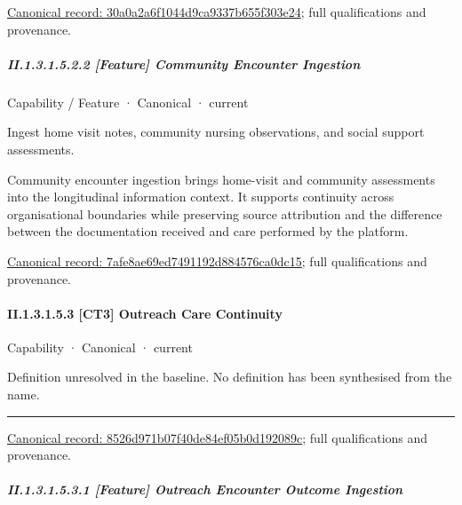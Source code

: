 {\footnotesize \href{../../../../continuum/strategy/capability/feature/30a0a2a6f1044d9ca9337b655f303e24.md}{Canonical record: 30a0a2a6f1044d9ca9337b655f303e24}; full qualifications and provenance.}\par
\subparagraph*{II.1.3.1.5.2.2 [Feature] Community Encounter Ingestion}
\label{navigation:II.1.3.1.5.2.2}

\label{element:7afe8ae69ed7491192d884576ca0dc15}
{\small Capability / Feature · Canonical · current}\par

Ingest home visit notes, community nursing observations, and social support assessments.



Community encounter ingestion brings home-visit and community assessments into the longitudinal information context. It supports continuity across organisational boundaries while preserving source attribution and the difference between the documentation received and care performed by the platform.


{\footnotesize \href{../../../../continuum/strategy/capability/feature/7afe8ae69ed7491192d884576ca0dc15.md}{Canonical record: 7afe8ae69ed7491192d884576ca0dc15}; full qualifications and provenance.}\par
\paragraph*{II.1.3.1.5.3 [CT3] Outreach Care Continuity}
\label{navigation:II.1.3.1.5.3}

\label{element:8526d971b07f40de84ef05b0d192089c}
{\small Capability · Canonical · current}\par

Definition unresolved in the baseline. No definition has been synthesised from the name.



\medskip\hrule\medskip

{\footnotesize \href{../../../../continuum/strategy/capability/8526d971b07f40de84ef05b0d192089c.md}{Canonical record: 8526d971b07f40de84ef05b0d192089c}; full qualifications and provenance.}\par
\subparagraph*{II.1.3.1.5.3.1 [Feature] Outreach Encounter Outcome Ingestion}
\label{navigation:II.1.3.1.5.3.1}

